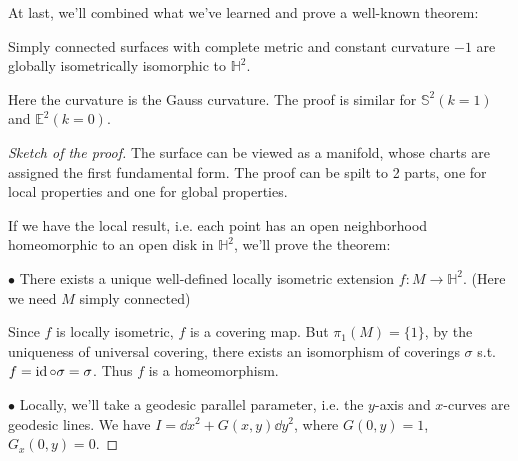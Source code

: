 At last, we'll combined what we've learned and prove a well-known theorem:
\begin{theorem}
    Simply connected surfaces with complete metric and constant curvature $-1$
	are globally isometrically isomorphic to $\mathbb{H}^2$.
\end{theorem}
\begin{remark}
    Here the curvature is the Gauss curvature. The proof is similar for
	$ \mathbb{S}^2(k=1)$ and $\mathbb{E}^2(k=0)$.
\end{remark}
\begin{proof}[Sketch of the proof]
    The surface can be viewed as a manifold, whose charts are assigned
	the first fundamental form. The proof can be spilt to 2 parts,
	one for local properties and one for global properties.

	If we have the local result, i.e. each point has an open neighborhood
	homeomorphic to an open disk in $\mathbb{H}^2$, we'll prove the theorem:

	$\bullet$ There exists a unique well-defined locally isometric
	extension $f: M\to \mathbb{H}^2$. (Here we need $M$ simply connected)

	Since $f$ is locally isometric, $f$ is a covering map.
	But $\pi_1(M) = \{1\}$, by the uniqueness of universal covering,
	there exists an isomorphism of coverings $\sigma$
	s.t. $f = \operatorname{id}\circ \sigma = \sigma$. Thus $f$ is a homeomorphism.

	$\bullet$ Locally, we'll take a geodesic parallel parameter,
	i.e. the $y$-axis and $x$-curves are geodesic lines.
	We have $I = \dd x^2 + G(x, y)\dd y^2$, where $G(0, y) = 1$, $G_x(0, y) = 0$.
\end{proof}
